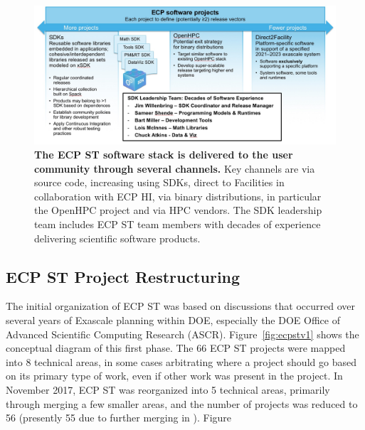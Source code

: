 \begin{figure}
	\centering
	\includegraphics[width=0.9\linewidth]{SoftwareStack}
	\caption{\textbf{The ECP ST software stack is delivered to the user community through several channels.} Key channels are via source code, increasing using SDKs, direct to Facilities in collaboration with ECP HI, via binary distributions, in particular the OpenHPC project and via HPC vendors.  The SDK leadership team includes  ECP ST team members with decades of experience delivering scientific software products.}
	\label{fig:softwarestack}
\end{figure}

\subsection{ECP ST Project Restructuring}\label{subsect:ProjectRestructuring}

The initial organization of ECP ST was based on discussions that occurred over several years of Exascale planning within DOE, especially the DOE Office of Advanced Scientific Computing Research (ASCR).  Figure~\ref{fig:ecpstv1} shows the conceptual diagram of this first phase.  The 66 ECP ST projects were mapped into 8 technical areas, in some cases arbitrating where a project should go based on its primary type of work, even if other work was present in the project.  In November 2017, ECP ST was reorganized into 5 technical areas, primarily through merging a few smaller areas, and the number of projects was reduced to 56 (presently 55 due to further merging in \ecosystem).  Figure

